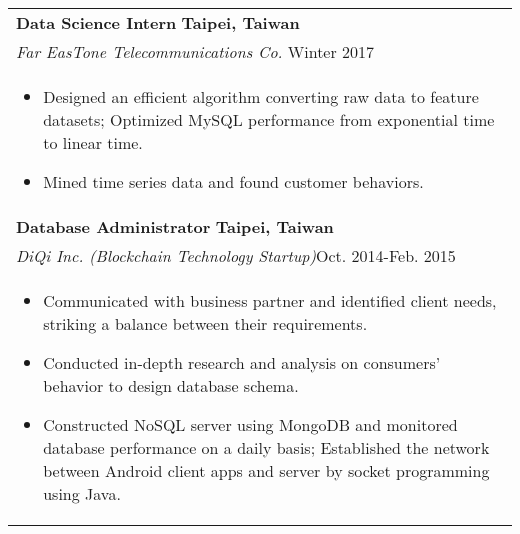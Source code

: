 \documentclass[a4paper,10pt]{article} %
\begin{document}
{\begin{tabular}{p{18.5cm}}
{\fontsize{11}{13.2}\textbf{Data Science Intern}} \hfill \textbf{Taipei, Taiwan}\\
{\it Far EasTone Telecommunications Co.} \hfill  Winter 2017\\%
\begin{itemize}
\vspace{-2mm}
\item Designed an efficient algorithm converting raw data to feature datasets; Optimized MySQL performance from exponential time to linear time.
\item Mined time series data and found customer behaviors.\vspace*{-\baselineskip}
\end{itemize} \\ 
\vspace{0.5mm}

%
{\fontsize{11}{13.2}\textbf{Database Administrator}} \hfill \textbf{Taipei, Taiwan}\\ 
{\it DiQi Inc. (Blockchain Technology Startup)}\hfill  Oct. 2014-Feb. 2015  \\%
\begin{itemize}
\vspace{-2mm}
\item Communicated with business partner and identified client needs, striking a balance between their requirements. 
\item Conducted in-depth research and analysis on consumers' behavior to design database schema.
\item Constructed NoSQL server using MongoDB and monitored database performance on a daily basis; Established the network between Android client apps and server by socket programming using Java. \vspace*{-\baselineskip}
\end{itemize}\\
\end{tabular}

}
\end{document}
